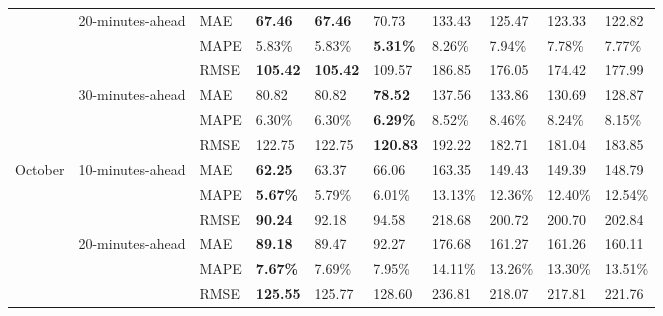 {\begin{longtable}[htb!]{llllllllll}
                           & {20-minutes-ahead}    & MAE                       & \textbf{67.46}     & \textbf{67.46}    & 70.73            & 133.43  & 125.47  & 123.33  & 122.82  \\
                           &                                      & MAPE                      & 5.83\%             & 5.83\%            & \textbf{5.31\%}  & 8.26\%  & 7.94\%  & 7.78\%  & 7.77\%  \\
                           &                                      & RMSE                      & \textbf{105.42}    & \textbf{105.42}   & 109.57           & 186.85  & 176.05  & 174.42  & 177.99  \\ \cline{2-10}
                           & {30-minutes-ahead}    & MAE                       & 80.82              & 80.82             & \textbf{78.52}   & 137.56  & 133.86  & 130.69  & 128.87  \\
                           &                                      & MAPE                      & 6.30\%             & 6.30\%            & \textbf{6.29\%}  & 8.52\%  & 8.46\%  & 8.24\%  & 8.15\%  \\
                           &                                      & RMSE                      & 122.75             & 122.75            & \textbf{120.83}  & 192.22  & 182.71  & 181.04  & 183.85  \\ \hline
{October}   & {10-minutes-ahead}    & MAE                       & \textbf{62.25}     & 63.37             & 66.06            & 163.35  & 149.43  & 149.39  & 148.79  \\
                           &                                      & MAPE                      & \textbf{5.67\%}    & 5.79\%            & 6.01\%           & 13.13\% & 12.36\% & 12.40\% & 12.54\% \\
                           &                                      & RMSE                      & \textbf{90.24}     & 92.18             & 94.58            & 218.68  & 200.72  & 200.70  & 202.84  \\ \cline{2-10}
                           & {20-minutes-ahead}    & MAE                       & \textbf{89.18}     & 89.47             & 92.27            & 176.68  & 161.27  & 161.26  & 160.11  \\
                           &                                      & MAPE                      & \textbf{7.67\%}    & 7.69\%            & 7.95\%           & 14.11\% & 13.26\% & 13.30\% & 13.51\% \\
                           &                                      & RMSE                      & \textbf{125.55}    & 125.77            & 128.60           & 236.81  & 218.07  & 217.81  & 221.76  \\ \cline{2-10}

\end{longtable}}
